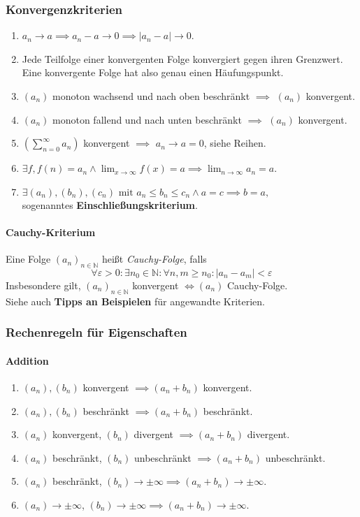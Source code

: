 \documentclass[a4paper, 9pt, DIV=24]{scrartcl}
\newcommand{\N}{\mathbb{N}}
\begin{document}
\subsubsection{Konvergenzkriterien}
\begin{enumerate}[label={(}\arabic*{)}]
\item $a_n \to a \implies a_n - a \to 0 \implies |a_n - a| \to 0$.
\item Jede Teilfolge einer konvergenten Folge konvergiert gegen ihren Grenzwert.
      Eine konvergente Folge hat also genau einen Häufungspunkt.
\item $(a_n)$ monoton wachsend und nach oben beschränkt $\implies$ $(a_n)$ konvergent.
\item $(a_n)$ monoton fallend und nach unten beschränkt $\implies$ $(a_n)$ konvergent.
\item $(\sum_{n=0}^{\infty} a_n)$ konvergent $\implies$ $a_n \to a = 0$, siehe Reihen.
\item $\exists f, f(n) = a_n \land \lim_{x\to\infty} f(x) = a \implies \lim_{n\to\infty} a_n = a$.
\item $\exists (a_n), (b_n), (c_n) \text{ mit } a_n \leq b_n \leq c_n \wedge a = c \implies b = a,$\\
      sogenanntes \textbf{Einschließungskriterium}.
\end{enumerate}

\paragraph{Cauchy-Kriterium}
Eine Folge $(a_n)_{n\in\N}$ heißt \emph{Cauchy-Folge}, falls
 \[ \forall \varepsilon > 0: \exists n_0 \in\N: \forall n,m \geq n_0: |a_n - a_m| < \varepsilon \]
Insbesondere gilt, $(a_n)_{n\in\N}$ konvergent $\iff (a_n)$ Cauchy-Folge.\\[.2em]
Siehe auch \textbf{Tipps an Beispielen} für angewandte Kriterien.

\subsubsection{Rechenregeln für Eigenschaften}
\paragraph{Addition}
\begin{enumerate}[label={(}\arabic*{)}]
 \item $(a_n), (b_n)$ konvergent $\implies (a_n + b_n)$ konvergent.
 \item $(a_n), (b_n)$ beschränkt $\implies (a_n + b_n)$ beschränkt.
 \item $(a_n)$ konvergent, $(b_n)$ divergent $\implies (a_n + b_n)$ divergent.
 \item $(a_n)$ beschränkt, $(b_n)$ unbeschränkt $\implies (a_n + b_n)$ unbeschränkt.
 \item $(a_n)$ beschränkt, $(b_n) \to \pm \infty \implies (a_n + b_n) \to \pm \infty$.
 \item $(a_n) \to \pm\infty$, $(b_n) \to \pm\infty \implies (a_n + b_n) \to \pm\infty$.
\end{enumerate}
\end{document}
